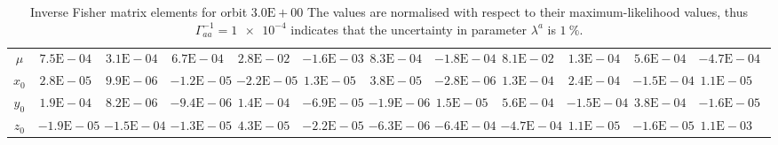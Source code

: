 \begin{sidewaystable}[htbp]
\begin{tabular}{cD{.}{.}{2.5}D{.}{.}{2.5}D{.}{.}{2.5}D{.}{.}{2.5}D{.}{.}{2.5}D{.}{.}{2.5}D{.}{.}{2.5}D{.}{.}{2.5}D{.}{.}{2.5}D{.}{.}{2.5}D{.}{.}{2.5}c}
$\mu$ & $7.5\mathrm{E}-04$ & $3.1\mathrm{E}-04$ & $6.7\mathrm{E}-04$ & $2.8\mathrm{E}-02$ & $-1.6\mathrm{E}-03$ & $8.3\mathrm{E}-04$ & $-1.8\mathrm{E}-04$ & $8.1\mathrm{E}-02$ & $1.3\mathrm{E}-04$ & $5.6\mathrm{E}-04$ & $-4.7\mathrm{E}-04$ \\
$x_0$ & $2.8\mathrm{E}-05$ & $9.9\mathrm{E}-06$ & $-1.2\mathrm{E}-05$ & $-2.2\mathrm{E}-05$ & $1.3\mathrm{E}-05$ & $3.8\mathrm{E}-05$ & $-2.8\mathrm{E}-06$ & $1.3\mathrm{E}-04$ & $2.4\mathrm{E}-04$ & $-1.5\mathrm{E}-04$ & $1.1\mathrm{E}-05$ \\
$y_0$ & $1.9\mathrm{E}-04$ & $8.2\mathrm{E}-06$ & $-9.4\mathrm{E}-06$ & $1.4\mathrm{E}-04$ & $-6.9\mathrm{E}-05$ & $-1.9\mathrm{E}-06$ & $1.5\mathrm{E}-05$ & $5.6\mathrm{E}-04$ & $-1.5\mathrm{E}-04$ & $3.8\mathrm{E}-04$ & $-1.6\mathrm{E}-05$ \\
$z_0$ & $-1.9\mathrm{E}-05$ & $-1.5\mathrm{E}-04$ & $-1.3\mathrm{E}-05$ & $4.3\mathrm{E}-05$ & $-2.2\mathrm{E}-05$ & $-6.3\mathrm{E}-06$ & $-6.4\mathrm{E}-04$ & $-4.7\mathrm{E}-04$ & $1.1\mathrm{E}-05$ & $-1.6\mathrm{E}-05$ & $1.1\mathrm{E}-03$
\bottomrule
\end{tabular}
\caption{Inverse Fisher matrix elements for orbit $3.0\mathrm{E}+00$ The values are normalised with respect to their maximum-likelihood values, thus $\Gamma^{-1}_{aa} = \num{1e-4}$ indicates that the uncertainty in parameter $\lambda^a$ is $\SI{1}{\percent}$.}
\label{tab:Fisher_3}
\end{sidewaystable}
